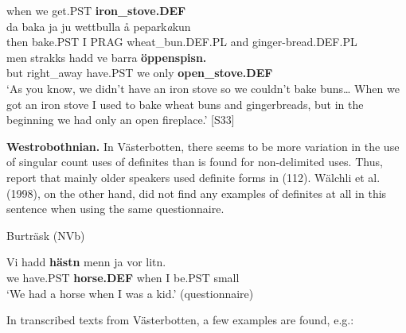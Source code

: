 when  we  get.PST  \textbf{iron\_stove.DEF}\\

 \ea\label{}
\gll da  baka  ja  ju  wettbulla  å  pepark\textit{a}kun\\


then  bake.PST  I  PRAG  wheat\_bun.DEF.PL  and  ginger-bread.DEF.PL\\

 \ea\label{}
\gll men  strakks  hadd  ve  barra  \textbf{öppenspisn.}\\


but  right\_away  have.PST  we  only  \textbf{open\_stove.DEF}\\

\glt ‘As you know, we didn’t have an iron stove so we couldn’t bake buns… When we got an iron stove I used to bake wheat buns and gingerbreads, but in the beginning we had only an open fireplace.’ [S33]

\z

\textbf{Westrobothnian.} In Västerbotten, there seems to be more variation in the use of singular count uses of definites than is found for non-delimited uses. Thus, \citet{BergholmEtAl1999} report that mainly older speakers used definite forms in (112). Wälchli et al. (1998), on the other hand, did not find any examples of definites at all in this sentence when using the same questionnaire.


\item 

\label{bkm:Ref224103495}Burträsk (NVb)



 \ea\label{}
\gll Vi  hadd  \textbf{hästn} menn  ja  vor  litn.\\


we  have.PST  \textbf{horse.DEF} when  I   be.PST  small\\

\glt ‘We had a horse when I was a kid.’ (questionnaire)

\z

In transcribed texts from Västerbotten, a few examples are found, e.g.:

